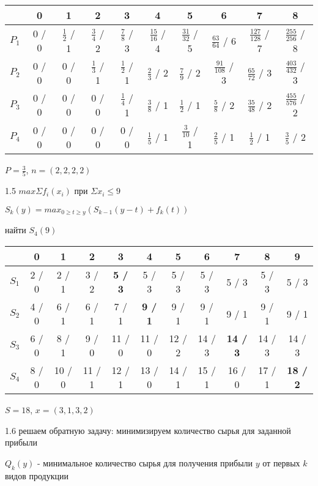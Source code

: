 \documentclass[russian]{article}
\begin{document}
\begin{tabular}{|c|c|c|c|c|c|c|c|c|c|}\hline
 & 0
 & 1
 & 2
 & 3
 & 4
 & 5
 & 6
 & 7
 & 8
\\\hline
$P_{1}$
 & 0 / 0
 & $\frac{1}{2}$ / 1
 & $\frac{3}{4}$ / 2
 & $\frac{7}{8}$ / 3
 & $\frac{15}{16}$ / 4
 & $\frac{31}{32}$ / 5
 & $\frac{63}{64}$ / 6
 & $\frac{127}{128}$ / 7
 & $\frac{255}{256}$ / 8
\\\hline
$P_{2}$
 & 0 / 0
 & 0 / 0
 & $\frac{1}{3}$ / 1
 & $\frac{1}{2}$ / 1
 & $\frac{2}{3}$ / 2
 & $\frac{7}{9}$ / 2
 & $\frac{91}{108}$ / 3
 & $\frac{65}{72}$ / 3
 & $\frac{403}{432}$ / 3
\\\hline
$P_{3}$
 & 0 / 0
 & 0 / 0
 & 0 / 0
 & $\frac{1}{4}$ / 1
 & $\frac{3}{8}$ / 1
 & $\frac{1}{2}$ / 1
 & $\frac{5}{8}$ / 2
 & $\frac{35}{48}$ / 2
 & $\frac{455}{576}$ / 2
\\\hline
$P_{4}$
 & 0 / 0
 & 0 / 0
 & 0 / 0
 & 0 / 0
 & $\frac{1}{5}$ / 1
 & $\frac{3}{10}$ / 1
 & $\frac{2}{5}$ / 1
 & $\frac{1}{2}$ / 1
 & $\frac{3}{5}$ / 2
\\\hline
\end{tabular}

$P=\frac{3}{5}$, $n=(2,2,2,2)$

1.5 $max\Sigma f_i (x_i)$ при $\Sigma x_i \le 9$

$S_k(y)=max_{0 \ge t \ge y} ( S_{k-1}(y-t) + f_k(t))$

найти $S_4(9)$

\begin{tabular}{|c|c|c|c|c|c|c|c|c|c|c|}\hline
		& 0 	& 1 	& 2 	& 3 	& 4		& 5 	& 6 	& 7 	& 8 	& 9  	\\\hline
$S_1$	& 2 / 0 & 2 / 1 & 3 / 2 & {\bf 5 / 3}	& 5 / 3 & 5 / 3 & 5 / 3 & 5 / 3 & 5 / 3 & 5 / 3 \\\hline
$S_2$	& 4 / 0 & 6 / 1 & 6 / 1 & 7 / 1 & {\bf 9 / 1 }& 9 / 1 & 9 / 1 & 9 / 1 & 9 / 1 & 9 / 1 \\\hline
$S_3$	& 6 / 0 & 8 / 1 & 9 / 0 & 11 / 0 & 11 / 0 & 12 / 2 & 14 / 3 & {\bf 14 / 3} & 14 / 3 & 14 / 3 \\\hline
$S_4$	& 8 / 0 & 10 / 0 & 11 / 1 & 12 / 1 & 13 / 0 & 14 / 1 & 15 / 1 & 16 / 0 & 17 / 1 & {\bf 18 / 2} \\\hline
\end{tabular}

$S = 18$, $x = (3, 1, 3, 2)$

1.6 решаем обратную задачу: минимизируем количество сырья для заданной прибыли

$Q_k(y)$ - минимальное количество сырья для получения прибыли $y$ от первых $k$ видов продукции
\end{document}
